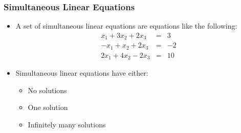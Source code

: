 \documentclass{beamer}
\begin{document}
\begin{frame}
  \frametitle{Simultaneous Linear Equations}

\begin{itemize}

\item A set of simultaneous linear equations are equations like the following:
\begin{eqnarray*}
x_1 + 3x_2 + 2x_3 & = & 3\\
-x_1 + x_2 + 2x_3 & = & -2\\
2x_1 + 4x_2 -2x_3 & = & 10
\end{eqnarray*}


\item Simultaneous linear equations have either:

\begin{itemize}
 \item No solutions
 \item One solution
 \item Infinitely many solutions
\end{itemize}
 
\end{itemize}


\end{frame}
\end{document}

